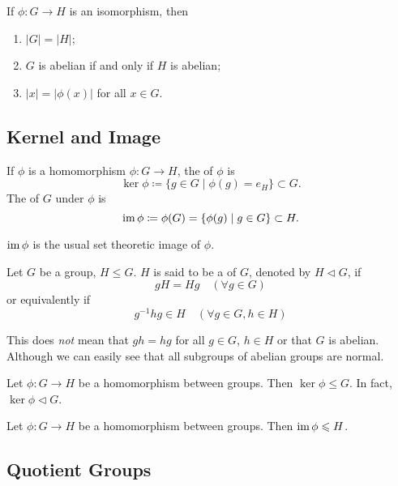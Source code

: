 \begin{proposition}
If $\phi:G\to H$ is an isomorphism, then
\begin{enumerate}[label=(\roman*)]
\item $|G|=|H|$;
\item $G$ is abelian if and only if $H$ is abelian;
\item $|x|=|\phi(x)|$ for all $x\in G$.
\end{enumerate}
\end{proposition}

\subsection{Kernel and Image}
\begin{definition}
If $\phi$ is a homomorphism $\phi:G\to H$, the  of $\phi$ is
\[\ker\phi\coloneqq\{g\in G\mid \phi(g)=e_H\}\subset G.\]
The  of $G$ under $\phi$ is
\[\operatorname{im}\phi\coloneqq\phi(G)=\{\phi(g)\mid g\in G\}\subset H.\]
\end{definition}

\begin{remark}
$\operatorname{im}\phi$ is the usual set theoretic image of $\phi$.
\end{remark}

\begin{definition}
Let $G$ be a group, $H\le G$. $H$ is said to be a  of $G$, denoted by $H\triangleleft G$, if
\[gH=Hg\quad(\forall g\in G)\]
or equivalently if
\[g^{-1}hg\in H\quad(\forall g\in G,h\in H)\]
\end{definition}

\begin{remark}
This does \emph{not} mean that $gh=hg$ for all $g\in G$, $h\in H$ or that $G$ is abelian. Although we can easily see that all subgroups of abelian groups are normal.
\end{remark}

\begin{proposition}
Let $\phi:G\to H$ be a homomorphism between groups. Then $\ker\phi\le G$. In fact, $\ker\phi\triangleleft G$.
\end{proposition}

\begin{proposition}
Let $\phi:G\to H$ be a homomorphism between groups. Then $\operatorname{im}\phi\leqslant H$.
\end{proposition}

\subsection{Quotient Groups}
\begin{definition}

\end{definition}

